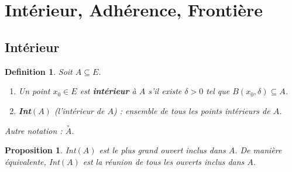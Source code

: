\documentclass{article}
\newtheorem{proposition}{Proposition}
\newtheorem{definition}{Definition}
\begin{document}
\sloppy

\section{Intérieur, Adhérence, Frontière}

\subsection{Intérieur}

\begin{definition}
Soit $A \subseteq E$.
\begin{enumerate}
    \item Un point $x_0 \in E$ est \textbf{intérieur} à $A$ s'il existe $\delta > 0$ tel que $B(x_0, \delta) \subseteq A$.
    \item \textbf{Int$(A)$} (l'intérieur de $A$) : ensemble de tous les points intérieurs de $A$.
\end{enumerate}
Autre notation : $\overset{\circ}{A}$.
\end{definition}

\begin{proposition}
Int$(A)$ est le plus grand ouvert inclus dans $A$. De manière équivalente, Int$(A)$ est la réunion de tous les ouverts inclus dans $A$.
\end{proposition}
\end{document}
